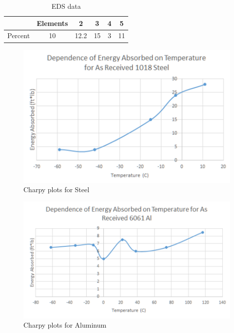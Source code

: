 \documentclass{article}
\begin{document}
\begin{table}[h]
\centering
\caption{EDS data}
\begin{tabular}{||c | c | c | c | c | c||}
	\hline
	\ 	& Elements & 2 & 3 & 4 & 5\\
	\hline \hline
	Percent		& 10 & 12.2 & 15 & 3 & 11\\
	\hline
\end{tabular}
\end{table}

\begin{figure}[h]
	\centering
	\includegraphics[scale=0.7]{2cf1.png}
	\caption{Charpy plots for Steel}
\end{figure}

\begin{figure}[h]
	\centering
	\includegraphics[scale=0.7]{2cf2.png}
	\caption{Charpy plots for Aluminum}
\end{figure}
\end{document}
